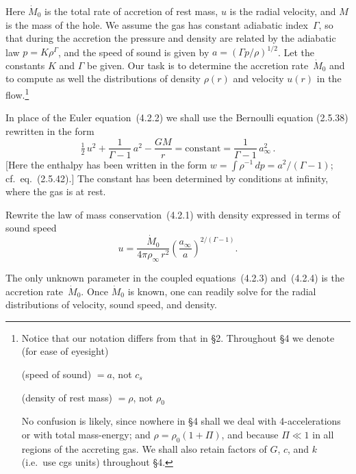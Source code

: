 Here $\dot{M}_0$ is the total rate of accretion of rest mass, $u$ is the radial
velocity, and $M$ is the mass of the hole.  We assume the gas has constant
adiabatic index~$\Gamma$, so that during the accretion the pressure and
density are related by the adiabatic law $p = K\rho^\Gamma$, and the speed of
sound is given by $a = (\Gamma p/\rho)^{1/2}$.  Let the constants $K$ and $\Gamma$
be given.  Our task is to determine the accretion rate~$\dot{M}_0$ and to
compute as well the distributions of density $\rho(r)$ and velocity $u(r)$
in the flow.\footnote{Notice that our notation differs from that in \S2.
Throughout \S4 we denote (for ease of eyesight)

(speed of sound) $= a$, not $c_s$

(density of rest mass) $= \rho$, not $\rho_0$

No confusion is likely, since nowhere in \S4 shall we deal with
4-accelerations or with total mass-energy; and
$\rho = \rho_0(1+\Pi)$, and because $\Pi \ll 1$ in all regions of the accreting gas.
We shall also retain factors of $G$, $c$, and $k$ (i.e.\ use cgs units)
throughout \S4.}

In place of the Euler equation~(4.2.2) we shall use the Bernoulli
equation (2.5.38) rewritten in the form
%
\begin{equation}
\tfrac{1}{2}\,u^2 + \frac{1}{\Gamma - 1}\,a^2 - \frac{GM}{r}
= \text{constant}
= \frac{1}{\Gamma - 1}\,a_\infty^2\,.
\tag{4.2.3}
\end{equation}
%
[Here the enthalpy has been written in the form
$w = \int \rho^{-1}\,dp = a^2/(\Gamma-1)$;
cf.\ eq.\ (2.5.42).]  The constant has been determined by conditions at
infinity, where the gas is at rest.

Rewrite the law of mass conservation~(4.2.1) with density expressed in terms
of sound speed
%
\begin{equation}
u = \frac{\dot{M}_0}{4\pi\rho_\infty\,r^2}
    \left(\frac{a_\infty}{a}\right)^{2/(\Gamma-1)}\!.
\tag{4.2.4}
\end{equation}

The only unknown parameter in the coupled equations~(4.2.3) and~(4.2.4) is
the accretion rate~$\dot{M}_0$.  Once $\dot{M}_0$ is known, one can readily
solve for the radial distributions of velocity, sound speed, and density.

